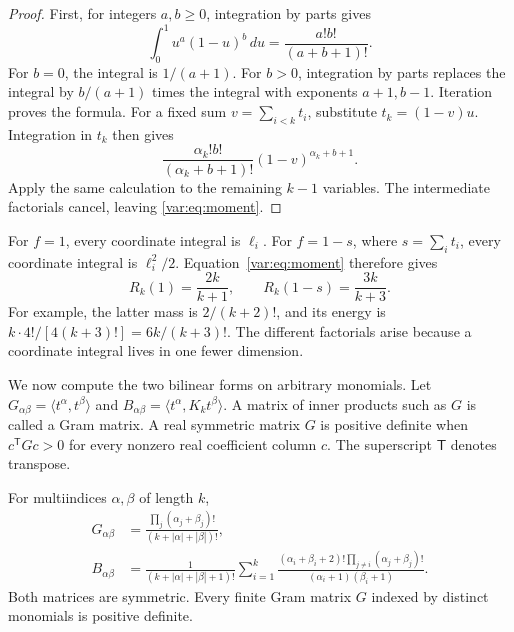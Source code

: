 \documentclass[11pt]{article}
\newcommand{\ip}[2]{\langle #1,#2\rangle}
\begin{document}
\begin{proof}
First, for integers $a,b\geq0$, integration by parts gives
\[
 \int_0^1u^a(1-u)^b\,du=\frac{a!b!}{(a+b+1)!}.
\]
For $b=0$, the integral is $1/(a+1)$.
For $b>0$, integration by parts replaces the integral by
$b/(a+1)$ times the integral with exponents $a+1,b-1$.
Iteration proves the formula.
For a fixed sum $v=\sum_{i<k}t_i$, substitute $t_k=(1-v)u$.
Integration in $t_k$ then gives
\[
 \frac{\alpha_k!b!}{(\alpha_k+b+1)!}
                   (1-v)^{\alpha_k+b+1}.
\]
Apply the same calculation to the remaining $k-1$ variables.
The intermediate factorials cancel, leaving \eqref{var:eq:moment}.
\end{proof}

For $f=1$, every coordinate integral is $\ell_i$.
For $f=1-s$, where $s=\sum_i t_i$, every coordinate integral is
$\ell_i^2/2$.  Equation~\eqref{var:eq:moment} therefore gives
\begin{equation}\label{var:eq:elementary}
 R_k(1)=\frac{2k}{k+1},\qquad R_k(1-s)=\frac{3k}{k+3}.
\end{equation}
For example, the latter mass is $2/(k+2)!$, and its energy is
$k\cdot4!/[4(k+3)!]=6k/(k+3)!$.
The different factorials arise because a coordinate integral lives in
one fewer dimension.

We now compute the two bilinear forms on arbitrary monomials.
Let $G_{\alpha\beta}=\ip{t^\alpha}{t^\beta}$ and
$B_{\alpha\beta}=\ip{t^\alpha}{K_kt^\beta}$.
A matrix of inner products such as $G$ is called a Gram matrix.
A real symmetric matrix $G$ is positive definite when $c^{\mathsf T}Gc>0$
for every nonzero real coefficient column $c$.  The superscript
$\mathsf T$ denotes transpose.

\begin{proposition}
For\label{var:prop:monomial} multiindices $\alpha,\beta$ of length $k$,
\begin{align}
 G_{\alpha\beta}
 &=\frac{\prod_j(\alpha_j+\beta_j)!}{(k+|\alpha|+|\beta|)!},
 \label{var:eq:G}\\
 B_{\alpha\beta}
 &=\frac{1}{(k+|\alpha|+|\beta|+1)!}
   \sum_{i=1}^k
   \frac{(\alpha_i+\beta_i+2)!\prod_{j\ne i}(\alpha_j+\beta_j)!}
        {(\alpha_i+1)(\beta_i+1)}.
 \label{var:eq:B}
\end{align}
Both matrices are symmetric.  Every finite Gram matrix $G$ indexed by
distinct monomials is positive definite.
\end{proposition}
\end{document}
